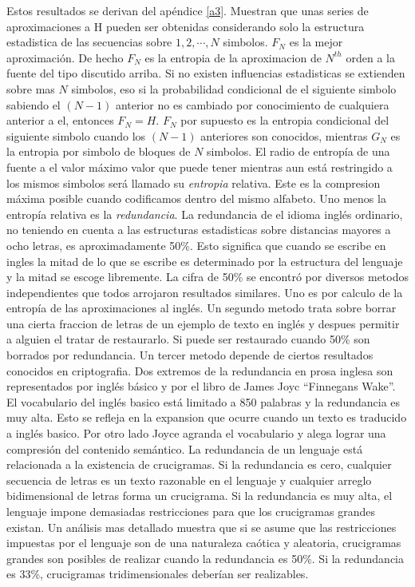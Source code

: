 Estos resultados se derivan del ap\'{e}ndice \ref{a3}. Muestran que
unas series de aproximaciones a H pueden ser obtenidas considerando
solo la estructura estadistica de las secuencias sobre $1, 2, \cdots,
N$ simbolos. $F_{N}$ es la mejor aproximaci\'{o}n. De hecho $F_{N}$ es
la entropia de la aproximacion de $N^{th}$ orden a la fuente del tipo
discutido arriba. Si no existen influencias estadisticas se extienden
sobre mas $N$ simbolos, eso si la probabilidad condicional de el
siguiente simbolo sabiendo el $(N-1)$ anterior no es cambiado por
conocimiento de cualquiera anterior a el, entonces $F_{N} =
H$. $F_{N}$ por supuesto es la entropia condicional del siguiente
simbolo cuando los $(N-1)$ anteriores son conocidos, mientras $G_{N}$
es la entropia por simbolo de bloques de $N$ simbolos.  El radio de
entrop\'{i}a de una fuente a el valor m\'{a}ximo valor que puede tener
mientras aun est\'{a} restringido a los mismos simbolos ser\'{a}
llamado su \textit{entropia} relativa. Este es la compresion
m\'{a}xima posible cuando codificamos dentro del mismo alfabeto. Uno
menos la entrop\'{i}a relativa es la \textit{redundancia}. La
redundancia de el idioma ingl\'{e}s ordinario, no teniendo en cuenta a
las estructuras estadisticas sobre distancias mayores a ocho letras,
es aproximadamente 50\%. Esto significa que cuando se escribe en
ingles la mitad de lo que se escribe es determinado por la estructura
del lenguaje y la mitad se escoge libremente. La cifra de 50\% se
encontr\'{o} por diversos metodos independientes que todos arrojaron
resultados similares. Uno es por calculo de la entrop\'{i}a de las
aproximaciones al ingl\'{e}s. Un segundo metodo trata sobre borrar una
cierta fraccion de letras de un ejemplo de texto en ingl\'{e}s y
despues permitir a alguien el tratar de restaurarlo. Si puede ser
restaurado cuando 50\% son borrados por redundancia. Un tercer metodo
depende de ciertos resultados conocidos en criptografia.  Dos extremos
de la redundancia en prosa inglesa son representados por ingl\'{e}s
b\'{a}sico y por el libro de James Joyc ``Finnegans Wake''. El
vocabulario del ingl\'{e}s basico est\'{a} limitado a 850 palabras y
la redundancia es muy alta. Esto se refleja en la expansion que ocurre
cuando un texto es traducido a ingl\'{e}s basico. Por otro lado Joyce
agranda el vocabulario y alega lograr una compresi\'{o}n del contenido
sem\'{a}ntico.  La redundancia de un lenguaje est\'{a} relacionada a
la existencia de crucigramas. Si la redundancia es cero, cualquier
secuencia de letras es un texto razonable en el lenguaje y cualquier
arreglo bidimensional de letras forma un crucigrama. Si la redundancia
es muy alta, el lenguaje impone demasiadas restricciones para que los
crucigramas grandes existan. Un an\'{a}lisis mas detallado muestra que
si se asume que las restricciones impuestas por el lenguaje son de una
naturaleza ca\'{o}tica y aleatoria, crucigramas grandes son posibles
de realizar cuando la redundancia es 50\%. Si la redundancia es 33\%,
crucigramas tridimensionales deber\'{i}an ser realizables.

